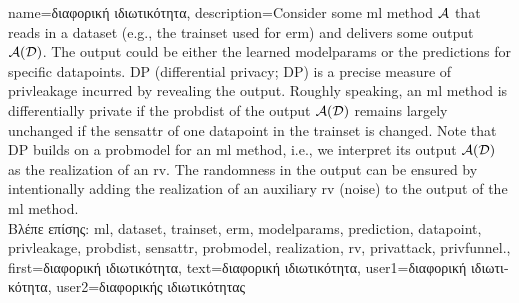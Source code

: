 {name={\foreignlanguage{greek}{διαφορική ιδιωτικότητα}},
 	description={Consider 
		some \gls{ml} method $\mathcal{A}$ that reads in a \gls{dataset} (e.g., the \gls{trainset} 
  		used for \gls{erm}) and delivers some output $\mathcal{A}(\mathcal{D})$. The output 
  		could be either the learned \glspl{modelparam} or the \gls{prediction}s for specific \gls{datapoint}s. 
  		DP (differential privacy; DP) is a precise measure of \gls{privleakage} incurred by revealing the 
  		output. Roughly speaking, an \gls{ml} method is differentially private if the \gls{probdist} 
  		of the output $\mathcal{A}(\mathcal{D})$ remains largely unchanged if the \gls{sensattr} 
  		of one \gls{datapoint} in the \gls{trainset} is changed. Note that DP 
  		builds on a \gls{probmodel} for an \gls{ml} method, i.e., we interpret its output $\mathcal{A}(\mathcal{D})$ 
  		as the \gls{realization} of an \gls{rv}. The randomness in the output can be ensured 
  		by intentionally adding the \gls{realization} of an auxiliary \gls{rv} (noise) to 
  		the output of the \gls{ml} method.\\
		\foreignlanguage{greek}{Βλέπε επίσης:} \gls{ml}, \gls{dataset}, \gls{trainset}, \gls{erm}, \glspl{modelparam}, \gls{prediction}, 
		\gls{datapoint}, \gls{privleakage}, \gls{probdist}, \gls{sensattr}, \gls{probmodel}, \gls{realization}, \gls{rv}, \gls{privattack}, \gls{privfunnel}.}, 
	first={\foreignlanguage{greek}{διαφορική ιδιωτικότητα}},
	text={\foreignlanguage{greek}{διαφορική ιδιωτικότητα}},
	user1={\foreignlanguage{greek}{διαφορική ιδιωτικότητα}}, %
   	user2={\foreignlanguage{greek}{διαφορικής ιδιωτικότητας}} %
}

